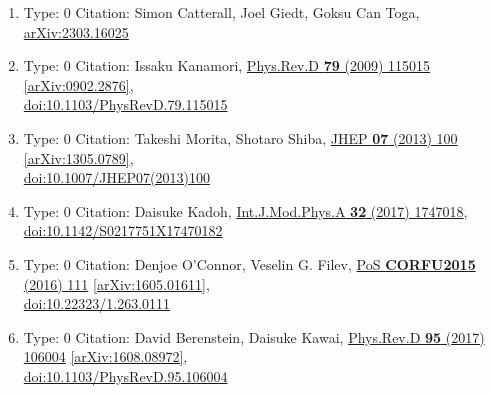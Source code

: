 \documentclass[a4paper,10pt]{article}
\begin{document}
\begin{enumerate}
\begin{enumerate}
  \item Type: 0 Citation: Simon Catterall, Joel Giedt, Goksu Can Toga, \href{https://arxiv.org/abs/2303.16025}{arXiv:2303.16025}
  \item Type: 0 Citation: Issaku Kanamori, \href{https://www.doi.org/10.1103/PhysRevD.79.115015}{Phys.Rev.D {\bf 79} (2009) 115015}  \href{https://arxiv.org/abs/0902.2876}{[arXiv:0902.2876]},\\\href{https://www.doi.org/10.1103/PhysRevD.79.115015}{doi:10.1103/PhysRevD.79.115015}
  \item Type: 0 Citation: Takeshi Morita, Shotaro Shiba, \href{https://www.doi.org/10.1007/JHEP07(2013)100}{JHEP {\bf 07} (2013) 100}  \href{https://arxiv.org/abs/1305.0789}{[arXiv:1305.0789]},\\\href{https://www.doi.org/10.1007/JHEP07(2013)100}{doi:10.1007/JHEP07(2013)100}
  \item Type: 0 Citation: Daisuke Kadoh, \href{https://www.doi.org/10.1142/S0217751X17470182}{Int.J.Mod.Phys.A {\bf 32} (2017) 1747018},\\\href{https://www.doi.org/10.1142/S0217751X17470182}{doi:10.1142/S0217751X17470182}
  \item Type: 0 Citation: Denjoe O'Connor, Veselin G. Filev, \href{https://www.doi.org/10.22323/1.263.0111}{PoS {\bf CORFU2015} (2016) 111}  \href{https://arxiv.org/abs/1605.01611}{[arXiv:1605.01611]},\\\href{https://www.doi.org/10.22323/1.263.0111}{doi:10.22323/1.263.0111}
  \item Type: 0 Citation: David Berenstein, Daisuke Kawai, \href{https://www.doi.org/10.1103/PhysRevD.95.106004}{Phys.Rev.D {\bf 95} (2017) 106004}  \href{https://arxiv.org/abs/1608.08972}{[arXiv:1608.08972]},\\\href{https://www.doi.org/10.1103/PhysRevD.95.106004}{doi:10.1103/PhysRevD.95.106004}

\end{enumerate}
\end{enumerate}
\end{document}
